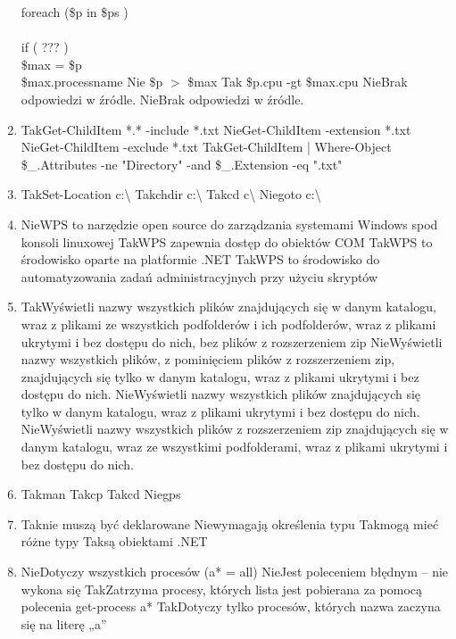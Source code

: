 \begin{enumerate}
{			foreach (\$p in \$ps )\\
			{\\
				if ( ??? )\\
				{ \$max = \$p }
			}\\
			\$max.processname
			}%
		{Nie}{ \$p $ > $ \$max }%
		{Tak}{ \$p.cpu -gt \$max.cpu }%
		{Nie}{Brak odpowiedzi w źródle.}%
		{Nie}{Brak odpowiedzi w źródle.}
		\item {}%
		{Tak}{Get-ChildItem *.* -include *.txt}%
		{Nie}{Get-ChildItem -extension *.txt}%
		{Nie}{Get-ChildItem -exclude *.txt}%
		{Tak}{Get-ChildItem | Where-Object {\$\_.Attributes -ne "Directory" -and \$\_.Extension -eq ".txt"}}
		
		\newpage
		\item {}%
		{Tak}{Set-Location c:\textbackslash}%
		{Tak}{chdir c:\textbackslash}%
		{Tak}{cd c\textbackslash}%
		{Nie}{goto c:\textbackslash}
		\item {}%
		{Nie}{WPS to narzędzie open source do zarządzania systemami Windows spod konsoli linuxowej}%
		{Tak}{WPS zapewnia dostęp do obiektów COM}%
		{Tak}{WPS to środowisko oparte na platformie .NET}%
		{Tak}{WPS to środowisko do automatyzowania zadań administracyjnych przy użyciu skryptów}
		\item {}%
		{Tak}{Wyświetli nazwy wszystkich plików znajdujących się w danym katalogu, wraz z plikami ze wszystkich podfolderów i ich podfolderów, wraz z plikami ukrytymi i bez dostępu do nich, bez plików z rozszerzeniem zip}%
		{Nie}{Wyświetli nazwy wszystkich plików, z pominięciem plików z rozszerzeniem zip, znajdujących się tylko w danym katalogu, wraz z plikami ukrytymi i bez dostępu do nich.}%
		{Nie}{Wyświetli nazwy wszystkich plików znajdujących się tylko w danym katalogu, wraz z plikami ukrytymi i bez dostępu do nich.}%
		{Nie}{Wyświetli nazwy wszystkich plików z rozszerzeniem zip znajdujących się w danym katalogu, wraz ze wszystkimi podfolderami, wraz z plikami ukrytymi i bez dostępu do nich.}
		\item {}%
		{Tak}{man}%
		{Tak}{cp}%
		{Tak}{cd}%
		{Nie}{gps}
		\item {}%
		{Tak}{nie muszą być deklarowane}%
		{Nie}{wymagają określenia typu}%
		{Tak}{mogą mieć różne typy}%
		{Tak}{są obiektami .NET}
		\item {}%
		{Nie}{Dotyczy wszystkich procesów (a* = all)}%
		{Nie}{Jest poleceniem błędnym – nie wykona się}%
		{Tak}{Zatrzyma procesy, których lista jest pobierana za pomocą polecenia get-process a*}%
		{Tak}{Dotyczy tylko procesów, których nazwa zaczyna się na literę „a”}
		

\end{enumerate}
